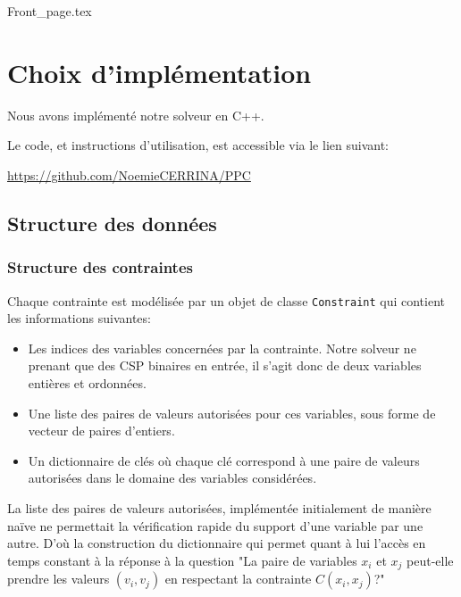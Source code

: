 \documentclass[14pt]{article}
\begin{document}
\renewcommand{\footrulewidth}{0.4pt}
\renewcommand{\headrulewidth}{0.4pt}

\vspace{0cm}              %


{Front_page.tex}

\clearpage
\thispagestyle{fancy}
\tableofcontents
\thispagestyle{fancy}      %

\clearpage

\section{Choix d'implémentation}

Nous avons implémenté notre solveur en C++.

Le code, et instructions d'utilisation, est accessible via le lien suivant:

 \href{https://github.com/NoemieCERRINA/PPC}{https://github.com/NoemieCERRINA/PPC}

\subsection{Structure des données}

\subsubsection{Structure des contraintes} \label{Structure des contraintes}
Chaque contrainte est modélisée par un objet de classe \texttt{Constraint} qui contient les informations suivantes:
\begin{itemize}
	\item Les indices des variables concernées par la contrainte. Notre solveur ne prenant que des CSP binaires en entrée, il s'agit donc de deux variables entières et ordonnées.
	\item Une liste des paires de valeurs autorisées pour ces variables, sous forme de vecteur de paires d'entiers.
	\item Un dictionnaire de clés où chaque clé correspond à une paire de valeurs autorisées dans le domaine des variables considérées.
\end{itemize}

La liste des paires de valeurs autorisées, implémentée initialement de manière naïve ne permettait la vérification rapide du support d'une variable par une autre. D'où la construction du dictionnaire qui permet quant à lui l'accès en temps constant à la réponse à la question "La paire de variables $x_i$ et $x_j$ peut-elle prendre les valeurs $(v_i,v_j)$ en respectant la contrainte $C(x_i,x_j)$?"
\end{document}
